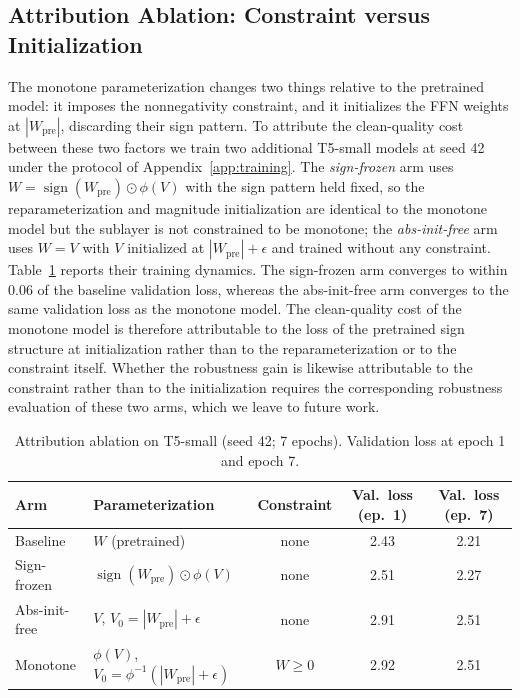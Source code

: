 \documentclass{article}
\theoremstyle{plain}
\theoremstyle{definition}
\theoremstyle{remark}
\theoremstyle{plain}
\begin{document}
\subsection{Attribution Ablation: Constraint versus Initialization}
\label{app:ablation}
The monotone parameterization changes two things relative to the pretrained model: it imposes the nonnegativity constraint, and it initializes the FFN weights at $|W_{\mathrm{pre}}|$, discarding their sign pattern. To attribute the clean-quality cost between these two factors we train two additional T5-small models at seed 42 under the protocol of Appendix~\ref{app:training}. The \emph{sign-frozen} arm uses $W = \operatorname{sign}(W_{\mathrm{pre}}) \odot \phi(V)$ with the sign pattern held fixed, so the reparameterization and magnitude initialization are identical to the monotone model but the sublayer is not constrained to be monotone; the \emph{abs-init-free} arm uses $W = V$ with $V$ initialized at $|W_{\mathrm{pre}}| + \epsilon$ and trained without any constraint. Table~\ref{tab:ablation} reports their training dynamics. The sign-frozen arm converges to within 0.06 of the baseline validation loss, whereas the abs-init-free arm converges to the same validation loss as the monotone model. The clean-quality cost of the monotone model is therefore attributable to the loss of the pretrained sign structure at initialization rather than to the reparameterization or to the constraint itself. Whether the robustness gain is likewise attributable to the constraint rather than to the initialization requires the corresponding robustness evaluation of these two arms, which we leave to future work.

\begin{table}[h]
\caption{Attribution ablation on T5-small (seed 42; 7 epochs). Validation loss at epoch 1 and epoch 7.}
\label{tab:ablation}
\vskip 0.1in
\begin{center}
\begin{small}
\begin{tabular}{llccc}
\toprule
Arm & Parameterization & Constraint & Val.\ loss (ep.\ 1) & Val.\ loss (ep.\ 7) \\
\midrule
Baseline & $W$ (pretrained) & none & 2.43 & 2.21 \\
Sign-frozen & $\operatorname{sign}(W_{\mathrm{pre}}) \odot \phi(V)$ & none & 2.51 & 2.27 \\
Abs-init-free & $V$, $V_0 = |W_{\mathrm{pre}}| + \epsilon$ & none & 2.91 & 2.51 \\
Monotone & $\phi(V)$, $V_0 = \phi^{-1}(|W_{\mathrm{pre}}| + \epsilon)$ & $W \ge 0$ & 2.92 & 2.51 \\
\bottomrule
\end{tabular}
\end{small}
\end{center}
\vskip -0.1in
\end{table}
\end{document}
